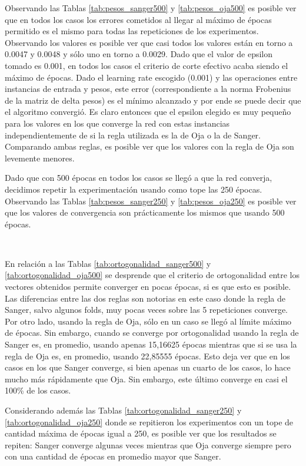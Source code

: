 \documentclass[informe.tex]{subfiles}
\begin{document}
	
	Observando las Tablas \ref{tab:pesos_sanger500} y \ref{tab:pesos_oja500} es posible ver que en todos los casos los errores cometidos al llegar al máximo de épocas permitido es el mismo para todas las repeticiones de los experimentos. Observando los valores es posible ver que casi todos los valores están en torno a 0.0047 y 0.0048 y sólo uno en torno a 0.0029. Dado que el valor de epsilon tomado es 0.001, en todos los casos el criterio de corte efectivo acaba siendo el máximo de épocas. Dado el learning rate escogido (0.001) y las operaciones entre instancias de entrada y pesos, este error (correspondiente a la norma Frobenius de la matriz de delta pesos) es el mínimo alcanzado y por ende se puede decir que el algoritmo convergió. Es claro entonces que el epsilon elegido es muy pequeño para los valores en los que converge la red con estas instancias independientemente de si la regla utilizada es la de Oja o la de Sanger. Comparando ambas reglas, es posible ver que los valores con la regla de Oja son levemente menores.
	
	Dado que con 500 épocas en todos los casos se llegó a que la red converja, decidimos repetir la experimentación usando como tope las 250 épocas. Observando las Tablas \ref{tab:pesos_sanger250} y \ref{tab:pesos_oja250} es posible ver que los valores de convergencia son prácticamente los mismos que usando 500 \'epocas. 
	
	~
	
	En relación a las Tablas \ref{tab:ortogonalidad_sanger500} y \ref{tab:ortogonalidad_oja500} se desprende que el criterio de ortogonalidad entre los vectores obtenidos permite converger en pocas épocas, si es que esto es posible. Las diferencias entre las dos reglas son notorias en este caso donde la regla de Sanger, salvo algunos folds, muy pocas veces sobre las 5 repeticiones converge. Por otro lado, usando la regla de Oja, sólo en un caso se llegó al límite máximo de épocas. Sin embargo, cuando se converge por ortogonalidad usando la regla de Sanger es, en promedio, usando apenas 15,16625 épocas mientras que si se usa la regla de Oja es, en promedio, usando 22,85555 épocas. Esto deja ver que en los casos en los que Sanger converge, si bien apenas un cuarto de los casos, lo hace mucho más rápidamente que Oja. Sin embargo, este último converge en casi el 100\% de los casos. 
	
	Considerando además las Tablas \ref{tab:ortogonalidad_sanger250} y \ref{tab:ortogonalidad_oja250} donde se repitieron los experimentos con un tope de cantidad máxima de épocas igual a 250, es posible ver que los resultados se repiten: Sanger converge algunas veces mientras que Oja converge siempre pero con una cantidad de épocas en promedio mayor que Sanger.
	
\end{document}
